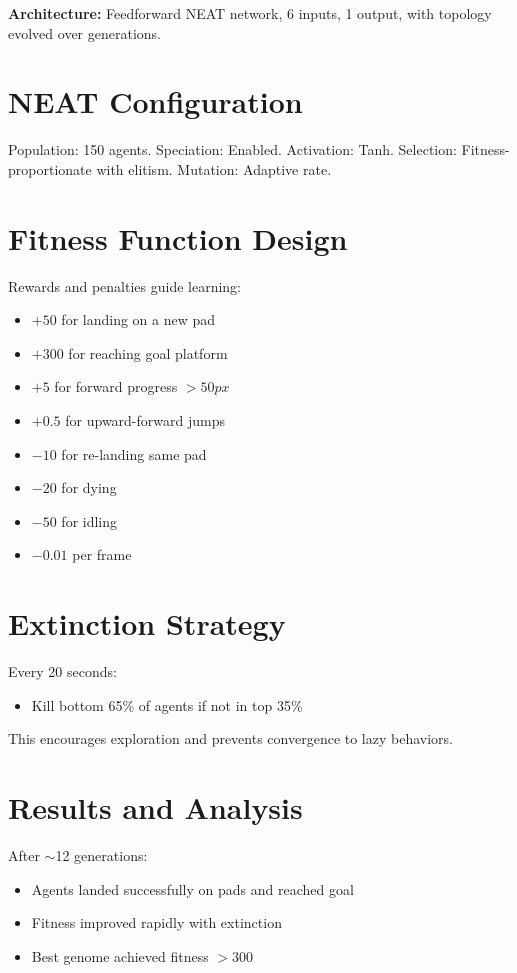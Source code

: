 \documentclass[10pt,conference]{IEEEtran}
\begin{document}
\textbf{Architecture:} Feedforward NEAT network, 6 inputs, 1 output, with topology evolved over generations.

\section{NEAT Configuration}
Population: 150 agents.  
Speciation: Enabled.  
Activation: Tanh.  
Selection: Fitness-proportionate with elitism.  
Mutation: Adaptive rate.

\section{Fitness Function Design}
Rewards and penalties guide learning:
\begin{itemize}
    \item $+50$ for landing on a new pad
    \item $+300$ for reaching goal platform
    \item $+5$ for forward progress $>50px$
    \item $+0.5$ for upward-forward jumps
    \item $-10$ for re-landing same pad
    \item $-20$ for dying
    \item $-50$ for idling
    \item $-0.01$ per frame
\end{itemize}

\section{Extinction Strategy}
Every 20 seconds:
\begin{itemize}
    \item Kill bottom 65\% of agents if not in top 35\%
\end{itemize}
This encourages exploration and prevents convergence to lazy behaviors.

\section{Results and Analysis}
After $\sim$12 generations:
\begin{itemize}
    \item Agents landed successfully on pads and reached goal
    \item Fitness improved rapidly with extinction
    \item Best genome achieved fitness $> 300$
\end{itemize}
\end{document}
